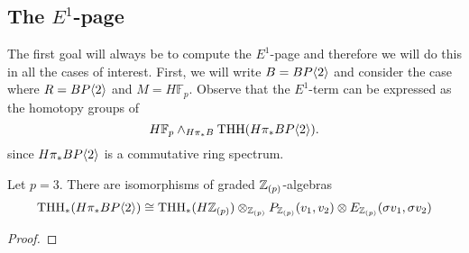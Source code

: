 \subsection{The $E^1$-page}
The first goal will always be to compute the $E^1$-page and therefore we will do this in all the cases of interest. First, we will write $B=BP\langle 2 \rangle$ and consider the case where $R=BP\langle 2 \rangle$ and $M=H\mathbb{F}_p$. Observe that the $E^1$-term can be expressed as the homotopy groups of
\[
H\mathbb{F}_p\wedge_{H\pi_*B}\operatorname{THH}(H\pi_*BP\langle 2 \rangle).
\]
since $H\pi_*BP\langle 2 \rangle$ is a commutative ring spectrum. 

\begin{comment}
First, we recall from \cite[Lurie Rotational invariance]{qx} that we can build an $E_{2}$-spectrum $\bbS[x]$ with homotopy groups $\pi_*\bbS[x]\cong \pi_*(\bbS)[x]$ where $|x|=2d$ as the Thom spectrum of a map 
\[ \N \to \Z \simeq \Omega^{2}BU(1)\to \Omega^{2}BU\simeq \Omega^{2d}BU\overset{\beta^{2d}}{\longrightarrow}BU\times \mathbb{Z}.\]
We then construct an $E_2$-ring $\bbS[v_1,v_2]$ where $\bbS[v_1]$ is constructed as above and then $\bbS[v_1,v_2]$ is then constructed by the same construction as $\bbS[v_2]$, but in in $\bbS[v_1]$-modules. We can then do the same construction in $H\Z_p$-modules and we observe that, there is an equivalence of $E_2$-algebras
\[
H\pi_*\B\simeq  H\Z_p\wedge \bbS[v_1,v_2].
\]
\gabe{Proving this may be harder than I originally thought. I think it is still very possible using machinery of Lurie. Do we need it to be an equivalence as $E_2$-algebras or just $E_1$-algebras? $E_1$-algebras should be much easier.}
\end{comment}
\begin{prop}
Let $p=3$. There are isomorphisms of graded $\mathbb{Z}_{(p)}$-algebras
\[
\operatorname{THH}_*(H\pi_*BP\langle 2 \rangle) \cong  \operatorname{THH}_*(H\mathbb{Z}_{(p)})\otimes_{\mathbb{Z}_{(p)}} P_{\mathbb{Z}_{(p)}}(v_1,v_2)\otimes E_{\mathbb{Z}_{(p)}}(\sigma v_1,\sigma v_2)
\]
\end{prop}
\begin{proof}
\end{proof}
